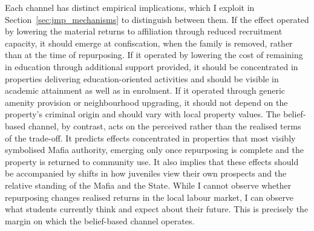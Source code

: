 \documentclass[12pt]{article}
\theoremstyle{plain}
\theoremstyle{plain}
\theoremstyle{plain}
\theoremstyle{definition}
\theoremstyle{plain}
\theoremstyle{definition}
\theoremstyle{plain}
\theoremstyle{remark}
\theoremstyle{definition}
\theoremstyle{definition}
\theoremstyle{plain}
\begin{document}
Each channel has distinct empirical implications, which I exploit in Section~\ref{sec:jmp_mechanisms} to distinguish between them. If the effect operated by lowering the material returns to affiliation through reduced recruitment capacity, it should emerge at confiscation, when the family is removed, rather than at the time of repurposing. If it operated by lowering the cost of remaining in education through additional support provided, it should be concentrated in properties delivering education-oriented activities and should be visible in academic attainment as well as in enrolment. If it operated through generic amenity provision or neighbourhood upgrading, it should not depend on the property's criminal origin and should vary with local property values. The belief-based channel, by contrast, acts on the perceived rather than the realised terms of the trade-off. It predicts effects concentrated in properties that most visibly symbolised Mafia authority, emerging only once repurposing is complete and the property is returned to community use. It also implies that these effects should be accompanied by shifts in how juveniles view their own prospects and the relative standing of the Mafia and the State. While I cannot observe whether repurposing changes realised returns in the local labour market, I can observe what students currently think and expect about their future. This is precisely the margin on which the belief-based channel operates. \par

\end{document}
